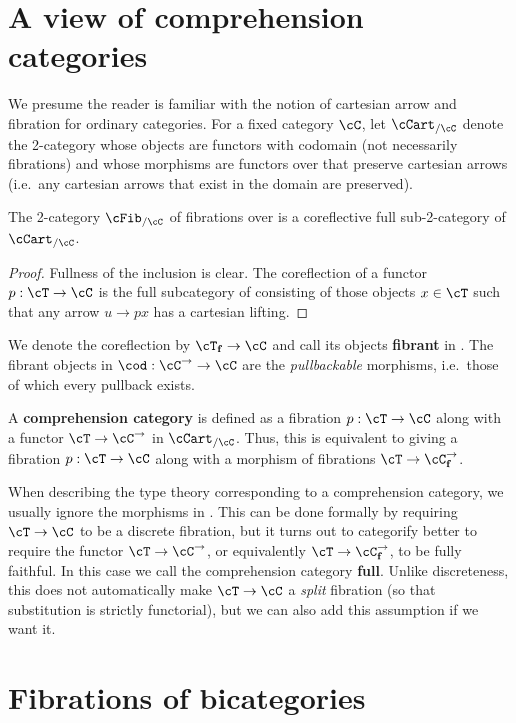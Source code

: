 \documentclass{amsart}
\def\f{_{\mathbf{f}}}
\begin{document}
\section{A view of comprehension categories}
\label{sec:compcat}

We presume the reader is familiar with the notion of cartesian arrow and fibration for ordinary categories.
For a fixed category $\cC$, let $\cCart_{/\cC}$ denote the 2-category whose objects are functors with codomain \cC (not necessarily fibrations) and whose morphisms are functors over \cC that preserve cartesian arrows (i.e.\ any cartesian arrows that exist in the domain are preserved).

\begin{thm}
  The 2-category $\cFib_{/\cC}$ of fibrations over \cC is a coreflective full sub-2-category of $\cCart_{/\cC}$.
\end{thm}
\begin{proof}
  Fullness of the inclusion is clear.
  The coreflection of a functor $p:\cT\to\cC$ is the full subcategory of \cT consisting of those objects $x\in \cT$ such that any arrow $u\to p x$ has a cartesian lifting.
\end{proof}

We denote the coreflection by $\cT\f \to \cC$ and call its objects \textbf{fibrant} in \cT.
The fibrant objects in $\cod: \cC^\to \to \cC$ are the \emph{pullbackable} morphisms, i.e.\ those of which every pullback exists.

A \textbf{comprehension category} is defined as a fibration $p:\cT\to\cC$ along with a functor $\cT\to\cC^\to$ in $\cCart_{/\cC}$.
Thus, this is equivalent to giving a fibration $p:\cT\to\cC$ along with a morphism of fibrations $\cT\to\cC^\to\f$.

When describing the type theory corresponding to a comprehension category, we usually ignore the morphisms in \cT.
This can be done formally by requiring $\cT\to\cC$ to be a discrete fibration, but it turns out to categorify better to require the functor $\cT\to\cC^\to$, or equivalently $\cT\to\cC^\to\f$, to be fully faithful.
In this case we call the comprehension category \textbf{full}.
Unlike discreteness, this does not automatically make $\cT\to\cC$ a \emph{split} fibration (so that substitution is strictly functorial), but we can also add this assumption if we want it.


\section{Fibrations of bicategories}
\label{sec:fib-bicat}
\end{document}
